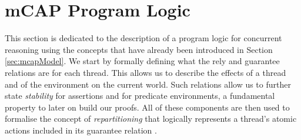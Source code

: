 \section{mCAP Program Logic}

\label{sec:mcapLogic}

This section is dedicated to the description of a program logic for concurrent reasoning using the concepts that have already been introduced in Section \ref{sec:mcapModel}. We start by formally defining what the rely and guarantee relations are for each thread. This allows us to describe the effects of a thread and of the environment on the current world. Such relations allow us to further state \textit{stability} for assertions and for predicate environments, a fundamental property to later on build our proofs. All of these components are then used to formalise the concept of \textit{repartitioning} that logically represents a thread's atomic actions included in its guarantee relation \cite{cap}\cite{colosl}.



\newpage



\newpage



\newpage



\newpage

